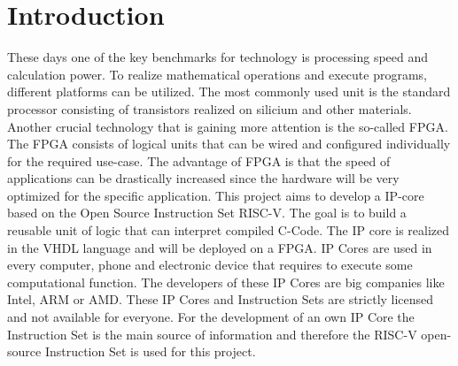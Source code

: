 
\chapter{Introduction}
These days one of the key benchmarks for technology is processing speed and
calculation power. To realize mathematical operations and execute programs,
different platforms can be utilized. The most commonly used unit is the standard
processor consisting of transistors realized on silicium and other materials.
Another crucial technology that is gaining more attention is the so-called
\acf{FPGA}. The FPGA consists of logical units that can
be wired and configured individually for the required use-case. The advantage of
FPGA is that the speed of applications can be drastically increased since the
hardware will be very optimized for the specific application.
This project aims to develop a \acf{IP}-core based on the Open
Source Instruction Set \acs{RISC}-V. The goal is to build a reusable unit of logic that can
interpret compiled C-Code. The IP core is realized in the \ac{VHDL} language and will be deployed on a FPGA. IP Cores are used in every computer, phone and electronic device that requires to execute some computational function. The developers of these IP Cores are big
companies like Intel, ARM or AMD. These IP Cores and Instruction Sets are strictly
licensed and not available for everyone. For the development of an own IP Core the
Instruction Set is the main source of information and therefore the RISC-V
open-source Instruction Set is used for this project.

